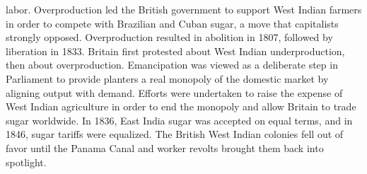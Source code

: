 labor. Overproduction led the British government to support West Indian farmers in order to compete with Brazilian and Cuban sugar, a move that capitalists strongly opposed. Overproduction resulted in abolition in 1807, followed by liberation in 1833. Britain first protested about West Indian underproduction, then about overproduction. Emancipation was viewed as a deliberate step in Parliament to provide planters a real monopoly of the domestic market by aligning output with demand. Efforts were undertaken to raise the expense of West Indian agriculture in order to end the monopoly and allow Britain to trade sugar worldwide. In 1836, East India sugar was accepted on equal terms, and in 1846, sugar tariffs were equalized. The British West Indian colonies fell out of favor until the Panama Canal and worker revolts brought them back into spotlight.